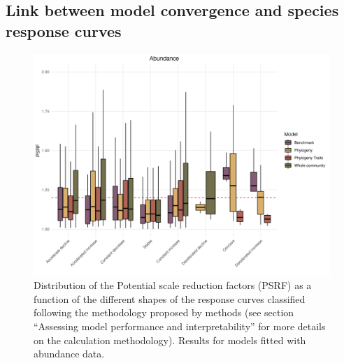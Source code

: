 \hypertarget{link-between-model-convergence-and-species-response-curves}{%
\subsection*{Link between model convergence and species response
curves}\label{link-between-model-convergence-and-species-response-curves}}

\begin{figure}
\hypertarget{fig:chapt1supp15}{%
\centering
\includegraphics{03-Chapitre1/figures/supplementary/fig_supp15.png}
\caption{Distribution of the Potential scale reduction factors (PSRF) as
a function of the different shapes of the response curves classified
following the methodology proposed by \textcite{Rigal_2020} methods (see
section ``Assessing model performance and interpretability'' for more
details on the calculation methodology). Results for models fitted with
abundance data.}\label{fig:chapt1supp15}
}
\end{figure}

